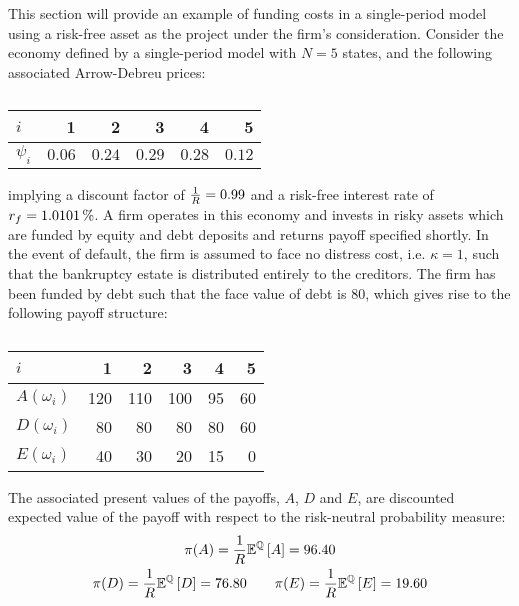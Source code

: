 \documentclass[main.tex]{subfiles}
\begin{document}
    This section will provide an example of funding costs in a single-period model
    using a risk-free asset as the project under the firm's consideration.
    Consider the economy defined by a single-period model with $N=5$ states, 
    and the following associated Arrow-Debreu prices:
        \begin{table}[H]
            \centering
            \begin{tabular}{l|rrrrr}
                $i$ & 1 & 2 & 3 & 4 & 5 \\
                \hline
                $\psi_{i}$ & $\num{0.06}$ & $\num{0.24}$ & $\num{0.29}$ & $\num{0.28}$ & $\num{0.12}$ \\
            \end{tabular}
            \caption{}
            \label{tbl:example-firm-structure}
        \end{table}
    implying a discount factor of $\frac{1}{R} = \num{0.99}$ and a risk-free interest rate of $\rfrate = \pct{0.010101}$.
    A firm operates in this economy and invests in risky assets 
    which are funded by equity and debt deposits and returns payoff specified shortly.
    In the event of default, the firm is assumed to face no distress cost, i.e. $\kappa = 1$, 
    such that the bankruptcy estate is distributed entirely to the creditors.
    The firm has been funded by debt such that the face value of debt is $\num{80}$, 
    which gives rise to the following payoff structure:
    \begin{table}[H]
        \centering
        \begin{tabular}{l|rrrrr}
            $i$ & 1 & 2 & 3 & 4 & 5 \\
            \hline
            $A(\omega_{i})$ & \num{120} & \num{110} & \num{100} & \num{95} & \num{60} \\
            $D(\omega_{i})$ & \num{80} & \num{80} & \num{80} & \num{80} & \num{60} \\
            $E(\omega_{i})$ & \num{40} & \num{30} & \num{20} & \num{15} & \num{0}
        \end{tabular}
        \caption{}
        \label{tbl:example-pre-project-capital-structure}
    \end{table}
    The associated present values of the payoffs, $A$, $D$ and $E$, 
    are discounted expected value of the payoff with respect to the risk-neutral probability measure:
        \begin{gather*}
            \pi(A) = \frac{1}{R} \mathbb{E}^{\mathbb{Q}}\left[A\right] = \num{96.40} \\
            \pi(D) = \frac{1}{R} \mathbb{E}^{\mathbb{Q}}\left[D\right] = \num{76.80}
            \qquad \pi(E) = \frac{1}{R} \mathbb{E}^{\mathbb{Q}}\left[E\right] = \num{19.60}
        \end{gather*}
\end{document}
